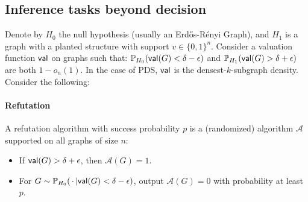 \documentclass[final,12pt]{colt2023} %
\newcommand\1[1]{\mathbb{I}_{\left\{#1\right\}}}
\begin{document}



\subsection{Inference tasks beyond decision}
\label{Defs}
 Denote by $H_0$ the null hypothesis (usually an Erd\H{o}s-R\'enyi Graph), and $H_1$ is a graph with a planted structure with support $v\in\{0,1\}^n$. Consider a valuation function $\mathsf{val}$ on graphs such that: $\mathbb{P}_{H_0}(\mathsf{val}(G)<\delta-\epsilon)$ and $\mathbb{P}_{H_1}(\mathsf{val}(G)>\delta+\epsilon)$ are both $1-o_n(1)$. In the case of PDS, $\mathsf{val}$ is the densest-$k$-subgraph density. Consider the following:


\paragraph{Refutation} A refutation algorithm with success probability $p$ is a (randomized) algorithm $\mathcal{A}$ supported on all graphs of size $n$:
\begin{itemize}
    \item If $\mathsf{val}(G)>\delta+\epsilon$, then $\mathcal{A}(G)=1$.
    \item For $G\sim \mathbb{P}_{H_0}(\,\cdot\,|{\mathsf{val}(G)<\delta-\epsilon})$, output $\mathcal{A}(G)=0$ with probability at least $p$.
\end{itemize}
\end{document}
